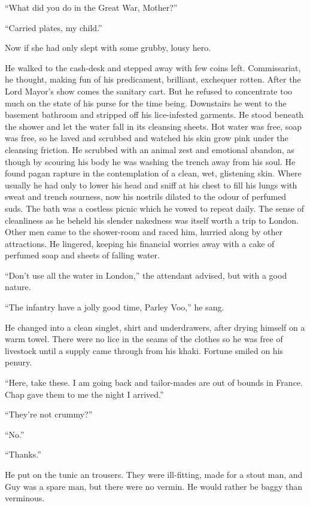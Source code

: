 ``What did you do in the Great War, Mother?''

``Carried plates, my child.''

Now if she had only slept with some grubby, lousy hero.

He walked to the cash-desk and stepped away with few coins left. Commissariat, he thought, making fun of his predicament, brilliant, exchequer rotten. After the Lord Mayor's show comes the sanitary cart. But he refused to concentrate too much on the state of his purse for the time being. Downstairs he went to the basement bathroom and stripped off his lice-infested garments. He stood beneath the shower and let the water fall in its cleansing sheets. Hot water was free, soap was free, so he laved and scrubbed and watched his skin grow pink under the cleansing friction. He scrubbed with an animal zest and emotional abandon, as though by scouring his body he was washing the trench away from his soul. He found pagan rapture in the contemplation of a clean, wet, glistening skin. Where usually he had only to lower his head and sniff at his chest to fill his lungs with sweat and trench sourness, now his nostrils dilated to the odour of perfumed suds. The bath was a costless picnic which he vowed to repeat daily. The sense of cleanliness as he beheld his slender nakedness was itself worth a trip to London. Other men came to the shower-room and raced him, hurried along by other attractions. He lingered, keeping his financial worries away with a cake of perfumed soap and sheets of falling water.

``Don't use  all the water in London,'' the attendant advised, but with a good nature.

``The infantry have a jolly good time, Parley Voo,'' he sang.

He changed into a clean singlet, shirt and underdrawers, after drying himself on a warm towel. There were no lice in the seams of the clothes so he was free of livestock until a supply came through from his khaki. Fortune smiled on his penury.

``Here, take these. I am going back and tailor-mades are out of bounds in France. Chap gave them to me the night I arrived.''

``They're not crummy?''

``No.''

``Thanks.''

He put on the tunic an trousers. They were ill-fitting, made for a stout man, and Guy was a spare man, but there were no vermin. He would rather be baggy than verminous.

